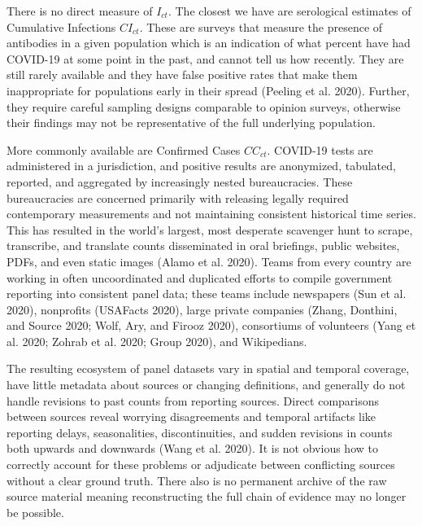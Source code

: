 \documentclass[
]{article}
\begin{document}
There is no direct measure of \(I_{ct}\). The closest we have are
serological estimates of Cumulative Infections \(CI_{ct}\). These are
surveys that measure the presence of antibodies in a given population
which is an indication of what percent have had COVID-19 at some point
in the past, and cannot tell us how recently. They are still rarely
available and they have false positive rates that make them
inappropriate for populations early in their spread (Peeling et al.
2020). Further, they require careful sampling designs comparable to
opinion surveys, otherwise their findings may not be representative of
the full underlying population.

More commonly available are Confirmed Cases \(CC_{ct}\). COVID-19 tests
are administered in a jurisdiction, and positive results are anonymized,
tabulated, reported, and aggregated by increasingly nested
bureaucracies. These bureaucracies are concerned primarily with
releasing legally required contemporary measurements and not maintaining
consistent historical time series. This has resulted in the world's
largest, most desperate scavenger hunt to scrape, transcribe, and
translate counts disseminated in oral briefings, public websites, PDFs,
and even static images (Alamo et al. 2020). Teams from every country are
working in often uncoordinated and duplicated efforts to compile
government reporting into consistent panel data; these teams include
newspapers (Sun et al. 2020), nonprofits (USAFacts 2020), large private
companies (Zhang, Donthini, and Source 2020; Wolf, Ary, and Firooz
2020), consortiums of volunteers (Yang et al. 2020; Zohrab et al. 2020;
Group 2020), and Wikipedians.

The resulting ecosystem of panel datasets vary in spatial and temporal
coverage, have little metadata about sources or changing definitions,
and generally do not handle revisions to past counts from reporting
sources. Direct comparisons between sources reveal worrying
disagreements and temporal artifacts like reporting delays,
seasonalities, discontinuities, and sudden revisions in counts both
upwards and downwards (Wang et al. 2020). It is not obvious how to
correctly account for these problems or adjudicate between conflicting
sources without a clear ground truth. There also is no permanent archive
of the raw source material meaning reconstructing the full chain of
evidence may no longer be possible.
\end{document}
